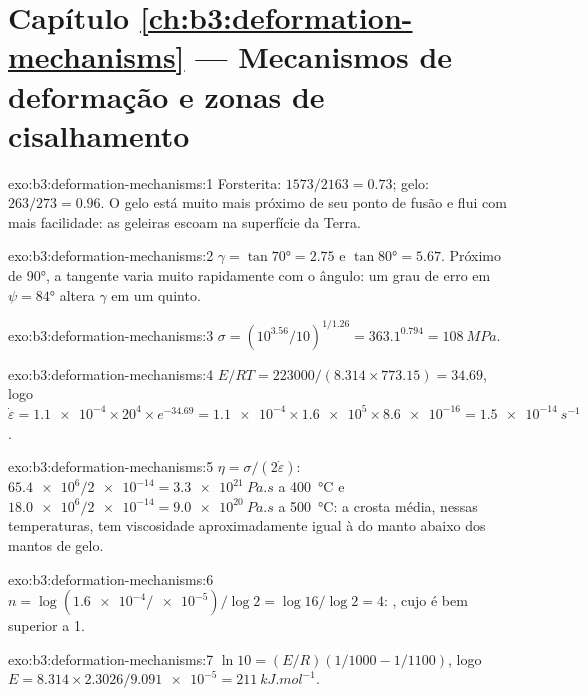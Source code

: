 \section*{Capítulo \ref{ch:b3:deformation-mechanisms} --- Mecanismos de deformação e zonas de cisalhamento}

\begin{solution}{exo:b3:deformation-mechanisms:1}
Forsterita: $1573/2163 = 0.73$; gelo: $263/273 = 0.96$. O gelo está muito mais próximo
de seu ponto de fusão e flui com mais facilidade: as geleiras escoam na superfície
da Terra.
\end{solution}

\begin{solution}{exo:b3:deformation-mechanisms:2}
$\gamma = \tan\ang{70} = 2.75$ e $\tan\ang{80} = 5.67$. Próximo de \ang{90}, a
tangente varia muito rapidamente com o ângulo: um grau de erro em $\psi =
\ang{84}$ altera $\gamma$ em um quinto.
\end{solution}

\begin{solution}{exo:b3:deformation-mechanisms:3}
$\sigma = (10^{3.56}/10)^{1/1.26} = 363.1^{0.794} = \qty{108}{MPa}$.
\end{solution}

\begin{solution}{exo:b3:deformation-mechanisms:4}
$E/RT = 223000/(8.314\times773.15) = 34.69$, logo $\dot\varepsilon =
\num{1.1e-4}\times20^4\times e^{-34.69} = \num{1.1e-4}\times\num{1.6e5}\times
\num{8.6e-16} = \qty{1.5e-14}{s^{-1}}$.
\end{solution}

\begin{solution}{exo:b3:deformation-mechanisms:5}
$\eta = \sigma/(2\dot\varepsilon)$: $\num{65.4e6}/\num{2e-14} =
\qty{3.3e21}{Pa.s}$ a \qty{400}{\celsius} e $\num{18.0e6}/\num{2e-14} =
\qty{9.0e20}{Pa.s}$ a \qty{500}{\celsius}: a crosta média, nessas
temperaturas, tem viscosidade aproximadamente igual à do manto abaixo dos mantos de gelo.
\end{solution}

\begin{solution}{exo:b3:deformation-mechanisms:6}
$n = \log(\num{1.6e-4}/\num{e-5})/\log2 = \log16/\log2 = 4$: ,
cujo  é bem superior a 1.
\end{solution}

\begin{solution}{exo:b3:deformation-mechanisms:7}
$\ln10 = (E/R)(1/1000 - 1/1100)$, logo $E = 8.314\times2.3026/\num{9.091e-5} =
\qty{211}{kJ.mol^{-1}}$.
\end{solution}


